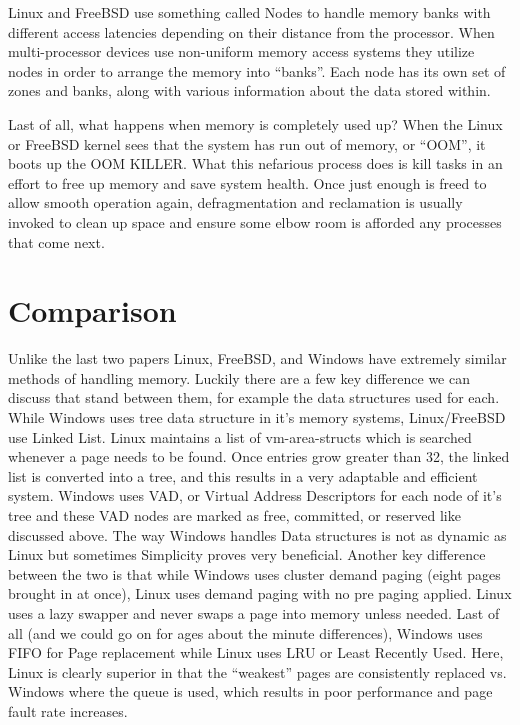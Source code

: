 \documentclass[onecolumn, draftclsnofoot,10pt, compsoc]{IEEEtran}
\begin{document}
Linux and FreeBSD use something called Nodes to handle memory banks with different access latencies depending on their distance from the processor. When multi-processor devices use non-uniform memory access systems they utilize nodes in order to arrange the memory into “banks”. Each node has its own set of zones and banks, along with various information about the data stored within. \cite{linux}

Last of all, what happens when memory is completely used up? When the Linux or FreeBSD kernel sees that the system has run out of memory, or “OOM”, it boots up the OOM KILLER. What this nefarious process does is kill tasks in an effort to free up memory and save system health. Once just enough is freed to allow smooth operation again, defragmentation and reclamation is usually invoked to clean up space and ensure some elbow room is afforded any processes that come next. \cite{linux} 



	
\section{Comparison}
Unlike the last two papers Linux, FreeBSD, and Windows have extremely similar methods of handling memory. Luckily there are a few key difference we can discuss that stand between them, for example the data structures used for each. While Windows uses tree data structure in it’s memory systems, Linux/FreeBSD use Linked List. Linux maintains a list of vm-area-structs which is searched whenever a page needs to be found. Once entries grow greater than 32, the linked list is converted into a tree, and this results in a very adaptable and efficient system. Windows uses VAD, or Virtual Address Descriptors for each node of it’s tree and these VAD nodes are marked as free, committed, or reserved like discussed above. \cite{compare} The way Windows handles Data structures is not as dynamic as Linux but sometimes Simplicity proves very beneficial. Another key difference between the two is that while Windows uses cluster demand paging (eight pages brought in at once), Linux uses demand paging with no pre paging applied. Linux uses a lazy swapper and never swaps a page into memory unless needed. Last of all (and we could go on for ages about the minute differences), Windows uses FIFO for Page replacement while Linux uses LRU or Least Recently Used. Here, Linux is clearly superior in that the “weakest” pages are consistently replaced vs. Windows where the queue is used, which results in poor performance and page fault rate increases. \cite{compare}
\end{document}
